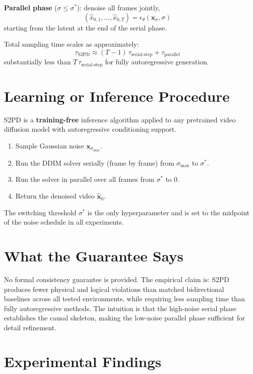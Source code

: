 \documentclass[10pt,twocolumn]{article}
\begin{document}
\textbf{Parallel phase} ($\sigma \leq \sigma^*$): denoise all frames jointly,
\[
(\hat{x}_{0,1}, \ldots, \hat{x}_{0,T}) = \epsilon_\theta(\mathbf{x}_\sigma, \sigma)
\]
starting from the latent at the end of the serial phase.

Total sampling time scales as approximately:
\[
\tau_\text{S2PD} \approx (T - 1)\,\tau_\text{serial-step} + \tau_\text{parallel}
\]
substantially less than $T\,\tau_\text{serial-step}$ for fully autoregressive
generation.

\section{Learning or Inference Procedure}

S2PD is a \textbf{training-free} inference algorithm applied to any pretrained
video diffusion model with autoregressive conditioning support.

\begin{enumerate}[itemsep=2pt,parsep=0pt]
  \item Sample Gaussian noise $\mathbf{x}_{\sigma_\text{max}}$.
  \item Run the DDIM solver serially (frame by frame) from $\sigma_\text{max}$
    to $\sigma^*$.
  \item Run the solver in parallel over all frames from $\sigma^*$ to $0$.
  \item Return the denoised video $\hat{\mathbf{x}}_0$.
\end{enumerate}

The switching threshold $\sigma^*$ is the only hyperparameter and is set
to the midpoint of the noise schedule in all experiments.

\section{What the Guarantee Says}

No formal consistency guarantee is provided. The empirical claim is: S2PD
produces fewer physical and logical violations than matched bidirectional
baselines across all tested environments, while requiring less sampling time
than fully autoregressive methods. The intuition is that the high-noise serial
phase establishes the causal skeleton, making the low-noise parallel phase
sufficient for detail refinement.

\section{Experimental Findings}
\end{document}
